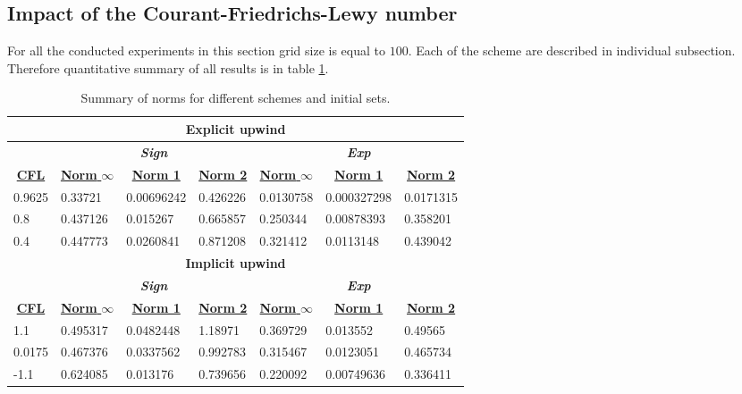 \subsection{Impact of the Courant-Friedrichs-Lewy number} \label{sec:impactCFL}
	For all the conducted experiments in this section grid size is equal to $100$. Each of the scheme are described in individual subsection. Therefore quantitative summary of all results is in table \ref{tab:impactCFL}.
	
	
	
	
	
	
	\begin{table}[]
		\centering
		\caption{Summary of norms for different schemes and initial sets.}
		\label{tab:impactCFL}
				\begin{tabular}{|l|l|l|l|l|l|l|}
					\hline
					\multicolumn{7}{|c|}{\textbf{Explicit upwind}} \\ \hline
					& \multicolumn{3}{|c|}{\textit{\textbf{Sign}}} & \multicolumn{3}{|c|}{\textit{\textbf{Exp}}} \\ \hline
					\multicolumn{1}{|c|}{{\ul \textbf{CFL}}} & \multicolumn{1}{|c|}{{\ul \textbf{Norm }$\infty$}} & \multicolumn{1}{c}{{\ul \textbf{Norm 1}}} & \multicolumn{1}{|c|}{{\ul \textbf{Norm 2}}} & \multicolumn{1}{|c|}{{\ul \textbf{Norm }$\infty$}} & \multicolumn{1}{|c|}{{\ul \textbf{Norm 1}}} & \multicolumn{1}{|c|}{{\ul \textbf{Norm 2}}} \\ \hline \hline
					0.9625 & 0.33721 & 0.00696242 & 0.426226 & 0.0130758 & 0.000327298 & 0.0171315 \\ \hline
					0.8 & 0.437126 & 0.015267 & 0.665857 & 0.250344 & 0.00878393 & 0.358201 \\ \hline
					0.4 & 0.447773 & 0.0260841 & 0.871208 & 0.321412 & 0.0113148 & 0.439042 \\ \hline \hline
					
					\multicolumn{7}{|c|}{\textbf{Implicit upwind}} \\ \hline
					& \multicolumn{3}{|c|}{\textit{\textbf{Sign}}} & \multicolumn{3}{|c|}{\textit{\textbf{Exp}}} \\ \hline
					\multicolumn{1}{|c|}{{\ul \textbf{CFL}}} & \multicolumn{1}{|c|}{{\ul \textbf{Norm }$\infty$}} & \multicolumn{1}{|c|}{{\ul \textbf{Norm 1}}} & \multicolumn{1}{|c|}{{\ul \textbf{Norm 2}}} & \multicolumn{1}{|c|}{{\ul \textbf{Norm }$\infty$}} & \multicolumn{1}{|c|}{{\ul \textbf{Norm 1}}} & \multicolumn{1}{||c|}{{\ul \textbf{Norm 2}}} \\ \hline \hline
					1.1 & 0.495317 & 0.0482448 & 1.18971 & 0.369729 & 0.013552 & 0.49565 \\ \hline
					0.0175 & 0.467376 & 0.0337562 & 0.992783 & 0.315467 & 0.0123051 & 0.465734 \\ \hline
					-1.1 & 0.624085 & 0.013176 & 0.739656 & 0.220092 & 0.00749636 & 0.336411 \\ \hline
					\hline
					

\end{tabular}
\end{table}
